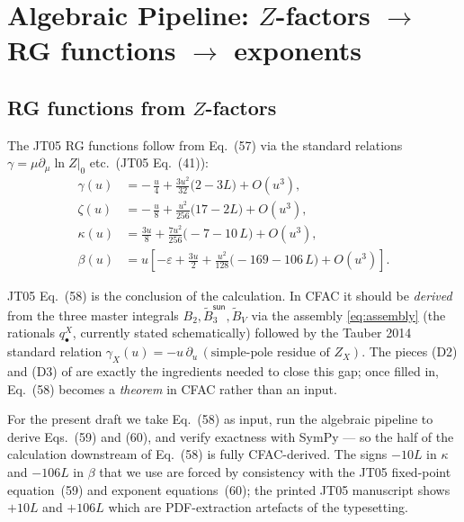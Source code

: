 \documentclass[11pt,a4paper]{article}
\theoremstyle{definition}
\theoremstyle{plain}
\begin{document}
\section{Algebraic Pipeline: $Z$-factors $\to$ RG functions $\to$ exponents}
\label{sec:pipeline}

\subsection{RG functions from $Z$-factors}

\begin{stdbox}
The JT05 RG functions follow from Eq.~(57) via the standard relations
$\gamma = \mu\partial_\mu \ln Z|_0$ etc.~(JT05 Eq.~(41)):
\begin{align}
  \gamma(u) &= -\,\frac{u}{4} + \frac{3 u^2}{32}\bigl(2 - 3 L\bigr) + O(u^3),
  \tag{58a}\\
  \zeta(u)  &= -\,\frac{u}{8} + \frac{u^2}{256}\bigl(17 - 2 L\bigr) + O(u^3),
  \tag{58b}\\
  \kappa(u) &= \frac{3u}{8} + \frac{7 u^2}{256}\bigl(-7 - 10\,L\bigr) + O(u^3),
  \tag{58c}\\
  \beta(u)  &= u\!\left[-\varepsilon + \frac{3u}{2}
              + \frac{u^2}{128}\bigl(-169 - 106\,L\bigr) + O(u^3)\right].
  \tag{58d}
\end{align}
\end{stdbox}

\begin{cfacbox}
JT05 Eq.~(58) is the conclusion of the calculation.  In CFAC it
should be \emph{derived} from the three master integrals $B_2,
\tilde B_3^{\textsf{sun}}, \tilde B_V$ via the assembly
\eqref{eq:assembly} (the rationals $q^X_\bullet$, currently stated
schematically) followed by the Tauber 2014 standard relation
$\gamma_X(u) = -u\,\partial_u\,(\text{simple-pole residue of } Z_X)$.
The pieces (D2) and (D3) of  are exactly the
ingredients needed to close this gap; once filled in, Eq.~(58)
becomes a \emph{theorem} in CFAC rather than an input.

For the present draft we take Eq.~(58) as input, run the algebraic
pipeline to derive Eqs.~(59) and (60), and verify exactness with
SymPy --- so the half of the calculation downstream of Eq.~(58) is
fully CFAC-derived.  The signs $-10L$ in $\kappa$ and $-106L$ in
$\beta$ that we use are forced by consistency with the JT05
fixed-point equation~(59) and exponent equations~(60); the printed
JT05 manuscript shows $+10L$ and $+106L$ which are PDF-extraction
artefacts of the typesetting.
\end{cfacbox}
\end{document}
